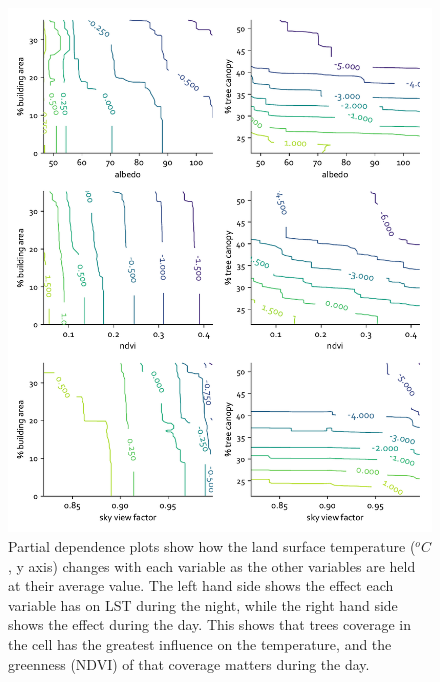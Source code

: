 \documentclass[final,3p,times,twocolumn,sort&compress]{elsarticle}
\begin{document}
\begin{figure}[h]
    \centering
    \includegraphics[width=\linewidth]{fig/report/pdp_2d_night_100.pdf}
    \caption{
    Partial dependence plots show how the land surface temperature ($^oC$, y axis) changes with each variable as the other variables are held at their average value. The left hand side shows the effect each variable has on LST during the night, while the right hand side shows the effect during the day. This shows that trees coverage in the cell has the greatest influence on the temperature, and the greenness (NDVI) of that coverage matters during the day.
    }
    \label{fig:pdp_2dnight}
\end{figure}
\end{document}
